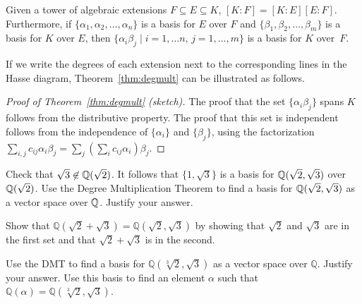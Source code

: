 \begin{theorem}\label{thm:degmult}
    Given a tower of algebraic extensions $F \subseteq E \subseteq K$, $[K:F]=[K:E][E:F]$. Furthermore, if $\{\alpha_1,\alpha_2,\ldots,\alpha_n\}$ is a basis for $E$ over $F$ and $\{\beta_1,\beta_2,\ldots,\beta_m\}$ is a basis for $K$ over $E$, then $\{\alpha_i\beta_j \mid i=1,\ldots n,\, j=1,\ldots,m \}$ is a basis for $K$ over~$F$.
\end{theorem}

If we write the degrees of each extension next to the corresponding lines in the Hasse diagram, Theorem~\ref{thm:degmult} can be illustrated as follows.
\begin{center}\small
{}
\end{center}

\begin{proof}[Proof of Theorem~\ref{thm:degmult} (sketch)]
The proof that the set $\{\alpha_i\beta_j\}$ spans $K$ follows from the distributive property. The proof that this set is independent follows from the independence of $\{\alpha_i\}$ and $\{\beta_j\}$, using the factorization $\sum_{i,j} c_{ij}\alpha_i\beta_j = \sum_j \left( \sum_i c_{ij} \alpha_i \right) \beta_j$.
\end{proof}

\begin{problem}
     Check that $\sqrt{3}\not\in \mathbb{Q}(\sqrt{2})$. It follows that $\{1, \sqrt{3}\}$ is a basis for $\mathbb{Q}(\sqrt{2}, \sqrt{3})$ over $\mathbb{Q}(\sqrt{2})$. Use the Degree Multiplication Theorem to find a basis for $\mathbb{Q}(\sqrt{2},\sqrt{3})$ as a vector space over $\mathbb{Q}$. Justify your answer.
\end{problem}

\begin{problem}
Show that $\mathbb{Q}\left(\sqrt{2}+\sqrt{3}\right) = \mathbb{Q}\left(\sqrt{2}, \sqrt{3}\right)$ by showing that $\sqrt{2}$ and $\sqrt{3}$ are in the first set and that $\sqrt{2}+\sqrt{3}$ is in the second.
\end{problem}

\begin{problem}
   Use the DMT to find  a basis for $\mathbb{Q}\left(\sqrt[3]{2},\sqrt{3}\right)$ as a vector space over $\mathbb{Q}$.  Justify your answer. Use this basis to find an element $\alpha$ such that $\mathbb{Q}(\alpha) = \mathbb{Q}\left(\sqrt[3]{2},\sqrt{3}\right)$.
\end{problem}

